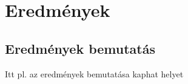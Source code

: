 \chapter{Eredmények}

\thispagestyle{fancy}
\pagestyle{fancy}

\section{Eredmények bemutatás}
Itt pl. az eredmények bemutatása kaphat helyet
